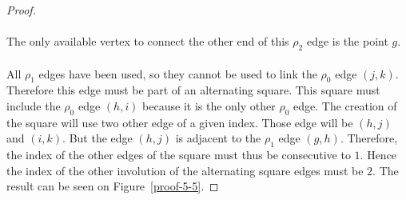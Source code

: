 \begin{proof}
\paragraph{}
The only available vertex to connect the other end of this $\rho_2$ edge is the point $g$.

\begin{figure}[H]
  \begin{center}
    \caption{}
  \end{center}
\end{figure}

\paragraph{}
All $\rho_1$ edges have been used, so they cannot be used to link the $\rho_0$ edge $(j,k)$. Therefore this edge must be part of an alternating square. This square must include the $\rho_0$ edge $(h,i)$ because it is the only other $\rho_0$ edge. The creation of the square will use two other edge of a given index. Those edge will be $(h,j)$ and $(i,k)$. But the edge $(h,j)$ is adjacent to the $\rho_1$ edge $(g,h)$. Therefore, the index of the other edges of the square must thus be consecutive to $1$. Hence the index of the other involution of the alternating square edges must be $2$. The result can be seen on Figure~\ref{proof-5-5}.


\end{proof}
